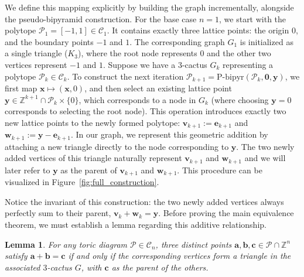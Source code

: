 \documentclass[a4paper,11pt,reqno]{amsart}
\newtheorem{lemma}[theorem]{Lemma}
\begin{document}
We define this mapping explicitly by building the graph incrementally, alongside the pseudo-bipyramid construction. 
For the base case $n=1$, we start with the polytope $\mathcal{P}_1 = [-1, 1] \in \mathcal{C}_1$. It contains exactly 
three lattice points: the origin $0$, and the boundary points $-1$ and $1$. The corresponding graph $G_1$ is 
initialized as a single triangle ($K_3$), where the root node represents $0$ and the other two vertices represent $-1$ 
and $1$. Suppose we have a $3$-cactus $G_k$ representing a polytope $\mathcal{P}_{k} \in \mathcal{C}_{k}$. 
To construct the next iteration $\mathcal{P}_{k+1} = \text{P-bipyr}(\mathcal{P}_{k}, \bm{0}, \bm{y})$, we first map 
$\bm{x} \mapsto (\bm{x},0)$, and then select an existing lattice point 
$\bm{y} \in \mathbb{Z}^{k+1} \cap \mathcal{P}_{k} \times \{0\}$, 
which corresponds to a node in $G_k$ (where choosing $\bm{y}=0$ corresponds to selecting the root node). 
This operation introduces exactly two new lattice points to the newly formed polytope: $\bm{v}_{k+1} := \bm{e}_{k+1}$ 
and $\bm{w}_{k+1} := \bm{y}-\bm{e}_{k+1}$. In our graph, we represent this geometric addition by attaching a 
new triangle directly to the node corresponding to $\bm{y}$. The two newly added vertices of this triangle naturally 
represent $\bm{v}_{k+1}$ and $\bm{w}_{k+1}$ and we will later refer to $\bm{y}$ as the parent of $\bm{v}_{k+1}$ and 
$\bm{w}_{k+1}$. This procedure can be visualized in Figure~\ref{fig:full_construction}.

Notice the invariant of this construction: the two newly added vertices always perfectly sum to their parent, 
$\bm{v}_k + \bm{w}_k = \bm{y}$. Before proving the main equivalence theorem, we must establish a lemma regarding 
this additive relationship.

\begin{lemma} \label{lemma:triangles}
For any toric diagram $\mathcal{P} \in \mathcal{C}_n$, three distinct points $\bm{a},\bm{b}, \bm{c} \in \mathcal{P} \cap \mathbb{Z}^n$ satisfy 
$\bm{a} + \bm{b} = \bm{c}$ if and only if the corresponding vertices form a triangle in the associated $3$-cactus $G$, with $\bm{c}$ as the parent 
of the others.
\end{lemma}
\end{document}

